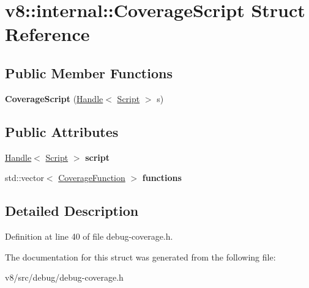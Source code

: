 \hypertarget{structv8_1_1internal_1_1CoverageScript}{}\section{v8\+:\+:internal\+:\+:Coverage\+Script Struct Reference}
\label{structv8_1_1internal_1_1CoverageScript}
\subsection*{Public Member Functions}
\begin{DoxyCompactItemize}
\item 
\mbox{\label{structv8_1_1internal_1_1CoverageScript_ae359f007ec193e5fba0bc53b10606011}} 
{\bfseries Coverage\+Script} (\mbox{\hyperlink{classv8_1_1internal_1_1Handle}{Handle}}$<$ \mbox{\hyperlink{classv8_1_1internal_1_1Script}{Script}} $>$ s)
\end{DoxyCompactItemize}
\subsection*{Public Attributes}
\begin{DoxyCompactItemize}
\item 
\mbox{\label{structv8_1_1internal_1_1CoverageScript_a2b3c9d0eb5724d74510f45f5f5459573}} 
\mbox{\hyperlink{classv8_1_1internal_1_1Handle}{Handle}}$<$ \mbox{\hyperlink{classv8_1_1internal_1_1Script}{Script}} $>$ {\bfseries script}
\item 
\mbox{\label{structv8_1_1internal_1_1CoverageScript_a93bd5ce427fd808e30b4f49464e16688}} 
std\+::vector$<$ \mbox{\hyperlink{structv8_1_1internal_1_1CoverageFunction}{Coverage\+Function}} $>$ {\bfseries functions}
\end{DoxyCompactItemize}


\subsection{Detailed Description}


Definition at line 40 of file debug-\/coverage.\+h.



The documentation for this struct was generated from the following file\+:\begin{DoxyCompactItemize}
\item 
v8/src/debug/debug-\/coverage.\+h\end{DoxyCompactItemize}

